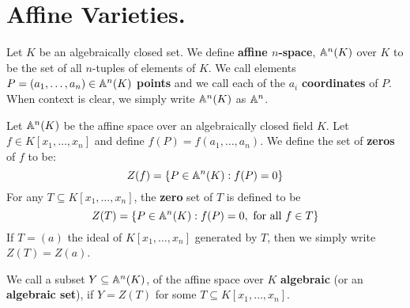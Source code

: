 \section{Affine Varieties.}

\begin{definition}
    Let $K$ be an algebraically closed set. We define \textbf{affine $n$-space},
    $\mathbb{A}^n(K)$ over $K$ to be the set of all $n$-tuples of elements of $K$. We
    call elements  $P=(a_1, \dots, a_n) \in \mathbb{A}^n(K)$ \textbf{points} and we call
    each of the $a_i$ \textbf{coordinates} of $P$. When context is clear, we
    simply write $\mathbb{A}^n(K)$ as $\mathbb{A}^n$.
\end{definition}

\begin{definition}
    Let $\mathbb{A}^n(K)$ be the affine space over an algebraically closed field $K$.
    Let  $f \in K[x_1, \dots, x_n]$ and define $f(P)=f(a_1, \dots, a_n)$. We
    define the set of \textbf{zeros} of $f$ to be:
    \begin{equation*}
        Z(f)=\{P \in \mathbb{A}^n(K) : f(P)=0\}
    \end{equation*}
    For any $T \subseteq K[x_1, \dots, x_n]$, the \textbf{zero} set of $T$ is
    defined to be
    \begin{equation*}
        Z(T)=\{P \in \mathbb{A}^n(K) : f(P)=0, \text{ for all } f \in T\}
    \end{equation*}
    If $T=(a)$ the ideal of $K[x_1, \dots, x_n]$ generated by $T$, then we
    simply write  $Z(T)=Z(a)$.
\end{definition}

\begin{definition}
    We call a subset $Y \subseteq \mathbb{A}^n(K)$, of the affine space over $K$
    \textbf{algebraic} (or an \textbf{algebraic set}), if $Y=Z(T)$ for some $T
    \subseteq K[x_1, \dots, x_n]$.
\end{definition}

